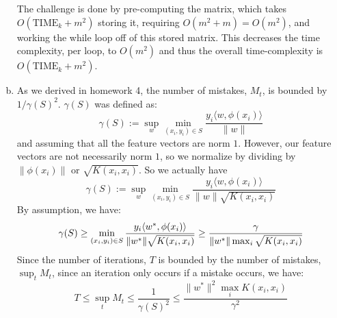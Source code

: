 \documentclass{amsart}
\newcommand{\TIMEk}{\mathrm{TIME}_k}
\theoremstyle{definition}
\begin{document}
\begin{enumerate}[(a)]
    The challenge is done by pre-computing the matrix, which takes $O(\TIMEk + m^2)$ storing it, requiring $O(m^2 + m) = O(m^2)$, and working the while loop off of this stored matrix. This decreases the time complexity, per loop, to $O(m^2)$ and thus the overall time-complexity is $O(\TIMEk + m^2)$.
  \item 
    As we derived in homework 4, the number of mistakes, $M_t$, is bounded by $1/\gamma(S)^2$. $\gamma(S)$ was defined as:
    \[
      \gamma(S) := \sup_w \min_{(x_i, y_i) \in S}\displaystyle\frac{y_i \langle w, \phi(x_i) \rangle}{\|w\|}
    \]
    and assuming that all the feature vectors are norm $1$. However, our feature vectors are not necessarily norm $1$, so we normalize by dividing by $\|\phi(x_i)\|$ or $\sqrt{K(x_i, x_i)}$. So we actually have 
    \[
      \gamma(S) := \sup_w \min_{(x_i, y_i) \in S}\displaystyle\frac{y_i \langle w, \phi(x_i) \rangle}{\|w\|\sqrt{K(x_i, x_i)}}
    \]
    By assumption, we have:
    \[
      \gamma(S) \ge \min_{(x_i, y_i) \in S} \displaystyle \displaystyle\frac{y_i \langle w^\ast, \phi(x_i) \rangle }{\|w^\ast\|\sqrt{K(x_i, x_i)}} \ge \displaystyle\frac{\gamma}{\|w^\ast\|\max_i \sqrt{K(x_i, x_i)}}
    \]
    Since the number of iterations, $T$ is bounded by the number of mistakes, $\sup_t M_t$, since an iteration only occurs if a mistake occurs, we have:
    \[
      T \le \sup_t M_t \le \displaystyle\frac{1}{\gamma(S)^2} \le \displaystyle\frac{\|w^\ast\|^2 \max_i K(x_i, x_i)}{\gamma^2}
    \]
    

\end{enumerate}
\end{document}
